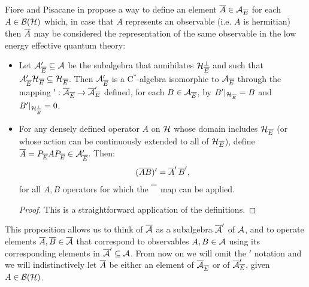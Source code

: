 Fiore and Pisacane in \cite{Fiore2018} propose a way to define an element $\overline{A} \in \mathcal A_{\overline{E}}$ for each $A \in \mathcal B(\mathcal H)$ which, in case that $A$ represents an observable (i.e. $A$ is hermitian) then $\overline{A}$ may be considered the representation of the same observable in the low energy effective quantum theory:
\begin{proposition}\label{propositionCutACutObservableDefinitionMultiplication}
        \hfill
        \begin{itemize}
            
            \item Let $\mathcal A_{\overline{E}}' \subseteq \mathcal A$ be the subalgebra that annihilates $\mathcal H_{\overline{E}}^\perp$ and such that $\mathcal A_{\overline{E}}' \mathcal H_{\overline{E}} \subseteq \mathcal H_{\overline{E}}$. Then $\mathcal A_{\overline{E}}'$ is a C$^*$-algebra isomorphic to $\mathcal A_{\overline{E}}$ through the mapping $': \overline{\mathcal A}_{\overline{E}} \to \overline{\mathcal A}_{\overline{E}}'$ defined, for each $B \in \mathcal A_{\overline{E}}$, by $B'|_{\mathcal H_{\overline{E}}} = B$ and $B'|_{\mathcal H_{\overline{E}}^\perp} = 0$.
            
            \item For any densely defined operator $A$ on $\mathcal H$ whose domain includes $\mathcal H_{\overline{E}}$ (or whose action can be continuously extended to all of $\mathcal H_{\overline{E}}$), define $\overline{A} = P_{\overline{E}} A P_{\overline{E}} \in \mathcal A_{\overline{E}}'$. Then:
            \begin{equation}
                (\overline{A} \overline{B})' = \overline{A}'\, \overline{B}',
            \end{equation}
            for all $A, B$ operators for which the $\cut{{\color{white}L}}$ map can be applied.
        \begin{proof}
        This is a straightforward application of the definitions.
        \end{proof}
        \end{itemize}
        \end{proposition}
        \begin{notation}\label{notationCutOverline}
        This proposition allows us to think of $\overline{\mathcal A}$ as a subalgebra $\overline{\mathcal A}'$ of $\mathcal A$, and to operate elements $\overline{A}, \overline{B} \in \overline{\mathcal A}$ that correspond to observables $A, B \in \mathcal A$ using its corresponding elements in $\overline{\mathcal A}' \subseteq \mathcal A$. From now on we will omit the $'$ notation and we will indistinctively let $\overline{A}$ be either an element of $\overline{\mathcal A}_{\overline{E}}$ or of $\overline{\mathcal A}_{\overline{E}}'$, given $A \in \mathcal B(\mathcal H)$.
        \end{notation}
         
